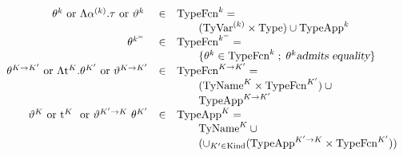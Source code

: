 \begin{figure}[h]
\begin{displaymath}
\begin{array}{rcl}
\typefnc[\k]\ {\rm or}\ 
\typetypefnc{\alphak}{\tau}\ {\rm or}\ 
\typeapptypefnc{\typeapp[\k]}\  & \in	& \TypeFnc[\k] = {} \\
                                &       & \qquad (\TyVar^{(\k)}\times\Type)
                                                 \cup \TypeApp[\k] \\
\typefnc[\keq]\  & \in	& \TypeFnc[\keq] = {}  \\
                                &       & \qquad \{\typefnc[\k]\in\TypeFnc[\k] \; ; \; \typefnc[\k] \mbox{{\sl admits equality}} \}\\
\typefnc[\Karr{\K}{\K'}]\ {\rm or}\ \typefnctypefnc{\t[\K]}{\typefnc[\K']}\
  {\rm or}\ \typeapptypefnc{\typeapp[\Karr{\K}{\K'}]}
        	& \in	& \TypeFnc[\Karr{\K}{\K'}] = {} \\
                &       & \qquad    (\TyName[\K]\times\TypeFnc[\K']) \cup {} \\
                &       & \qquad    \TypeApp[\Karr{\K}{\K'}] \\
\typeapp[\K]\ {\rm or}\ \tynametypeapp{\t[K]}\ 
\ {\rm or}\ \apptypeapp{\typeapp[\Karr{\K'}{\K}]}{\typefnc[\K']}
        	& \in	& \TypeApp[\K] = {} \\
                &       & \qquad    \TyName[\K] \cup {}\\
                &       & \qquad     (\cup_{\K'\in\Kind}
                                     (\TypeApp[\Karr{\K'}{\K}]
                                       \times \TypeFnc[\K']) )\\


\end{array}
\end{displaymath}
\end{figure}
